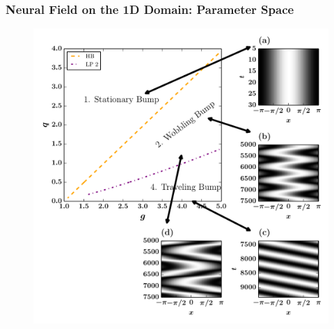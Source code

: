 \documentclass{beamer}
\begin{document}
\begin{frame}
\frametitle{Neural Field on the 1D Domain: Parameter Space}
\begin{figure}
 \includegraphics[width=.6\textwidth]{oned_full_2par4.pdf}
\end{figure}
\end{frame}
\end{document}
